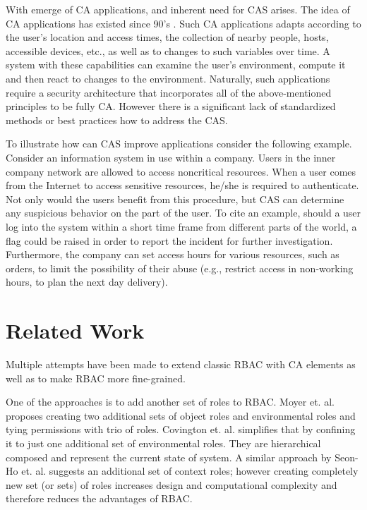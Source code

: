 \documentclass{sig-alternate}
\begin{document}
With emerge of CA applications, and inherent need for CAS arises. The idea of CA applications has existed since 90's \cite{contextaware}. Such CA applications adapts according to the user's location and access times, the collection of nearby people, hosts, accessible devices, etc., as well as to changes to such variables over time. A system with these capabilities can examine the user's environment, compute it and then react to changes to the environment. Naturally, such applications require a security architecture that incorporates all of the above-mentioned principles to be fully CA. However there is a significant lack of standardized methods or best practices how to address the CAS.

To illustrate how can CAS improve applications consider the following example. Consider an information system in use within a company. Users in the inner company network are allowed to access noncritical resources. When a user comes from the Internet to access sensitive resources, he/she is required to authenticate. Not only would the users benefit from this procedure, but CAS can determine any suspicious behavior on the part of the user. To cite an example, should a user log into the system within a short time frame from different parts of the world, a flag could be raised in order to report the incident for further investigation. Furthermore, the company can set access hours for various resources, such as orders, to limit the possibility of their abuse (e.g., restrict access in non-working hours, to plan the next day delivery).

\section{Related Work}
Multiple attempts have been made to extend classic RBAC with CA elements as well as to make RBAC more fine-grained.

One of the approaches is to add another set of roles to RBAC. Moyer et. al. \cite{grbac} proposes creating two additional sets of object roles and environmental roles and tying permissions with trio of roles. Covington et. al. \cite{envroles} simplifies that by confining it to just one additional set of environmental roles. They are hierarchical composed and represent the current state of system. A similar approach by Seon-Ho et. al. \cite{contextroles} suggests an additional set of context roles; however creating completely new set (or sets) of roles increases design and computational complexity and therefore reduces the advantages of RBAC.
\end{document}
